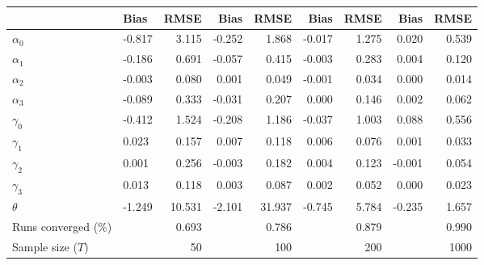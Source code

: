 
\begin{tabular}[t]{llrrrrrrr}
\toprule
  & Bias & RMSE & Bias & RMSE & Bias & RMSE & Bias & RMSE\\
\midrule
$\alpha_{0}$ & -0.817 & 3.115 & -0.252 & 1.868 & -0.017 & 1.275 & 0.020 & 0.539\\
$\alpha_{1}$ & -0.186 & 0.691 & -0.057 & 0.415 & -0.003 & 0.283 & 0.004 & 0.120\\
$\alpha_{2}$ & -0.003 & 0.080 & 0.001 & 0.049 & -0.001 & 0.034 & 0.000 & 0.014\\
$\alpha_{3}$ & -0.089 & 0.333 & -0.031 & 0.207 & 0.000 & 0.146 & 0.002 & 0.062\\
$\gamma_{0}$ & -0.412 & 1.524 & -0.208 & 1.186 & -0.037 & 1.003 & 0.088 & 0.556\\
$\gamma_{1}$ & 0.023 & 0.157 & 0.007 & 0.118 & 0.006 & 0.076 & 0.001 & 0.033\\
$\gamma_{2}$ & 0.001 & 0.256 & -0.003 & 0.182 & 0.004 & 0.123 & -0.001 & 0.054\\
$\gamma_{3}$ & 0.013 & 0.118 & 0.003 & 0.087 & 0.002 & 0.052 & 0.000 & 0.023\\
$\theta$ & -1.249 & 10.531 & -2.101 & 31.937 & -0.745 & 5.784 & -0.235 & 1.657\\
Runs converged (\%) &  & 0.693 &  & 0.786 &  & 0.879 &  & 0.990\\
Sample size ($T$) &  & 50 &  & 100 &  & 200 &  & 1000\\
\bottomrule
\end{tabular}
